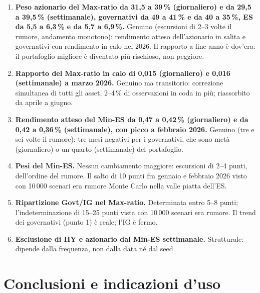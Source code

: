 \documentclass[11pt,a4paper]{article}
\begin{document}
\begin{enumerate}
\item \textbf{Peso azionario del Max-ratio da 31,5 a 39\,\% (giornaliero) e da 29,5 a 39,5\,\% (settimanale), governativi da 49 a 41\,\% e da 40 a 35\,\%, ES da 5,5 a 6,3\,\% e da 5,7 a 6,9\,\%.} Genuino (escursioni di 2--3 volte il rumore, andamento monotono): rendimento atteso dell'azionario in salita e governativi con rendimento in calo nel 2026. Il rapporto a fine anno \`e dov'era: il portafoglio migliore \`e diventato pi\`u rischioso, non peggiore.
\item \textbf{Rapporto del Max-ratio in calo di 0,015 (giornaliero) e 0,016 (settimanale) a marzo 2026.} Genuino ma transitorio: correzione simultanea di tutti gli asset, 2--4\,\% di osservazioni in coda in pi\`u; riassorbito da aprile a giugno.
\item \textbf{Rendimento atteso del Min-ES da 0,47 a 0,42\,\% (giornaliero) e da 0,42 a 0,36\,\% (settimanale), con picco a febbraio 2026.} Genuino (tre e sei volte il rumore): tre mesi negativi per i governativi, che sono met\`a (giornaliero) o un quarto (settimanale) del portafoglio.
\item \textbf{Pesi del Min-ES.} Nessun cambiamento maggiore: escursioni di 2--4 punti, dell'ordine del rumore. Il salto di 10 punti fra gennaio e febbraio 2026 visto con 10\,000 scenari era rumore Monte Carlo nella valle piatta dell'ES.
\item \textbf{Ripartizione Govt/IG nel Max-ratio.} Determinata entro 5--8 punti; l'indeterminazione di 15--25 punti vista con 10\,000 scenari era rumore. Il trend dei governativi (punto 1) \`e reale; l'IG \`e fermo.
\item \textbf{Esclusione di HY e azionario dal Min-ES settimanale.} Strutturale: dipende dalla frequenza, non dalla data n\'e dal seed.
\end{enumerate}

\section{Conclusioni e indicazioni d'uso}
\end{document}
